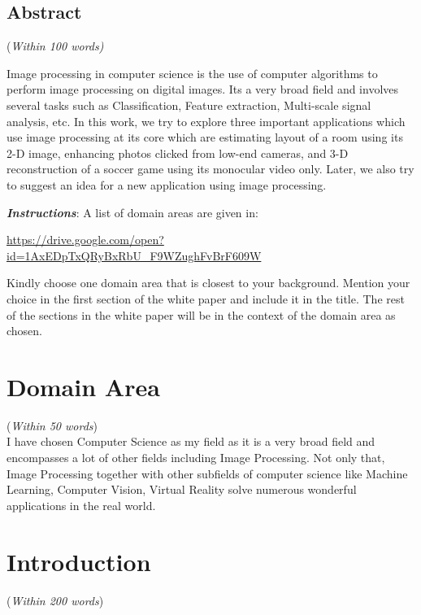 \documentclass[11pt]{article}
\begin{document}
\newpage

\begin{center}
\section*{Abstract}
({\em Within 100 words)} 

Image processing in computer science is the use of computer algorithms to perform image processing on digital images. Its a very broad field and involves several tasks such as Classification, Feature extraction, Multi-scale signal analysis, etc. In this work, we try to explore three important applications which use image processing at its core which are estimating layout of a room using its 2-D image, enhancing photos clicked from low-end cameras, and 3-D reconstruction of a soccer game using its monocular video only. Later, we also try to suggest an idea for a new application using image processing.

\end{center}
\newpage
{\bf {\em Instructions}}:
A list of domain areas are given in:
 
\begin{center}
\href{https://drive.google.com/open?id=1AxEDpTxQRyBxRbU\_F9WZughFvBrF609W}
{https://drive.google.com/open?id=1AxEDpTxQRyBxRbU\_F9WZughFvBrF609W}
\end{center}

Kindly choose one domain area that is closest to your background. Mention your choice in the first section of the white paper and include it in the title. The rest of the sections in the white paper will be in the context of the domain area as chosen.

\newpage
\section{Domain Area}
({\em Within 50 words})\\

I have chosen Computer Science as my field as it is a very broad field and encompasses a lot of other fields including Image Processing. Not only that, Image Processing together with other subfields of computer science like Machine Learning, Computer Vision, Virtual Reality solve numerous wonderful applications in the real world.

\section{Introduction}
({\em Within 200 words}) \\
\end{document}
